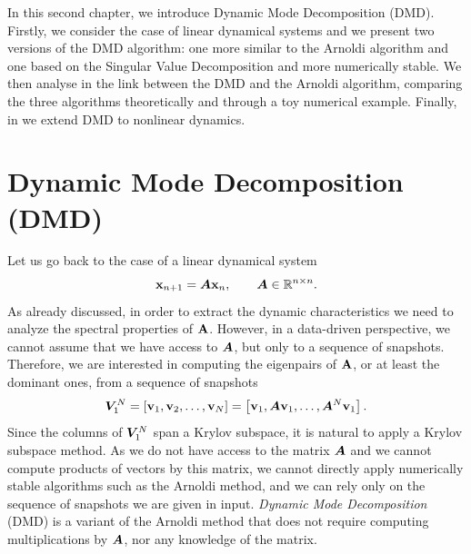 \label{chapter_dmd}
In this second chapter, we introduce Dynamic Mode Decomposition (DMD). Firstly, we consider the case of linear dynamical systems and we present two versions of the DMD algorithm: one more similar to the Arnoldi algorithm and one based on the Singular Value Decomposition and more numerically stable. We then analyse in  the link between the DMD and the Arnoldi algorithm, comparing the three algorithms theoretically and through a toy numerical example. Finally, in  we extend DMD to nonlinear dynamics.

\section{Dynamic Mode Decomposition (DMD)}
Let us go back to the case of a linear dynamical system
\begin{equation*}
    \vb{x}_{n+1} = \vb*{A}\vb{x}_n, \qquad \vb*{A}\in\mathbb{R}^{n\times n}.
\end{equation*}
As already discussed, in order to extract the dynamic characteristics we need to analyze the spectral properties of $\vb{A}$. However, in a data-driven perspective, we cannot assume that we have access to $\vb*{A}$, but only to a sequence of snapshots. Therefore, we are interested in computing the eigenpairs of $\vb{A}$, or at least the dominant ones, from a sequence of snapshots
\begin{equation*}
    \label{krylov_space}
    \vb*{V}_1^N = \left[\vb{v}_1, \vb{v}_2, \dots, \vb{v}_N\right] = \left[\vb{v}_1, \vb*{A}\vb{v}_1, \dots, \vb*{A}^N\vb{v}_1\right].
\end{equation*}
Since the columns of $\vb*{V}_1^N$ span a Krylov subspace, it is natural to apply a Krylov subspace method. As we do not have access to the matrix $\vb*{A}$ and we cannot compute products of vectors by this matrix, we cannot directly apply numerically stable algorithms such as the Arnoldi method, and we can rely only on the sequence of snapshots we are given in input. \emph{Dynamic Mode Decomposition} (DMD) \cite{schmid_dynamic_2010} is a variant of the Arnoldi method that does not require computing multiplications by $\vb*{A}$, nor any knowledge of the matrix. 


